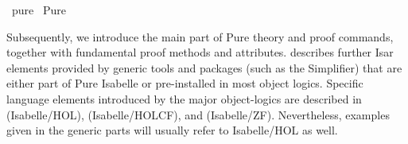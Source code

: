 %
\begin{isabellebody}%
\def\isabellecontext{pure}%
%
\isadelimtheory
\isanewline
\isanewline
%
\endisadelimtheory
%
\isatagtheory
{}\isamarkupfalse%
\ pure\isanewline
{}\ Pure\isanewline
{}%
\endisatagtheory
{\isafoldtheory}%
%
\isadelimtheory
%
\endisadelimtheory
%
\isamarkuptrue%
%
\begin{isamarkuptext}%
Subsequently, we introduce the main part of Pure theory and proof
  commands, together with fundamental proof methods and attributes.
   describes further Isar elements provided by
  generic tools and packages (such as the Simplifier) that are either
  part of Pure Isabelle or pre-installed in most object logics.
  Specific language elements introduced by the major object-logics are
  described in  (Isabelle/HOL), 
  (Isabelle/HOLCF), and  (Isabelle/ZF).  Nevertheless,
  examples given in the generic parts will usually refer to
  Isabelle/HOL as well.


\end{isamarkuptext}
\end{isabellebody}
